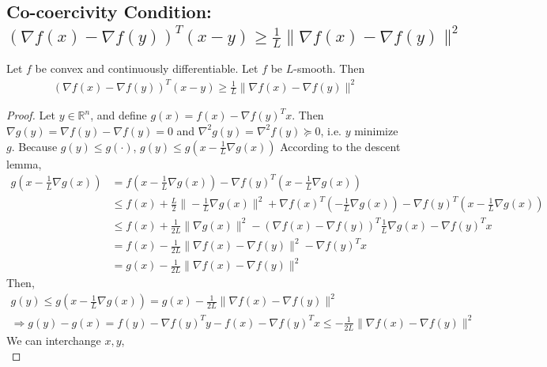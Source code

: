 \documentclass[11pt]{elegantbook}
\begin{document}
\subsection{Co-coercivity Condition: $(\nabla f(x)-\nabla f(y))^T(x-y)\geq \frac{1}{L}\|\nabla f(x)-\nabla f(y)\|^2$}
\begin{theorem}
Let $f$ be convex and continuously differentiable. Let $f$ be $L$-smooth. Then
\begin{equation}
    \begin{aligned}
        (\nabla f(x)-\nabla f(y))^T(x-y)\geq \frac{1}{L}\|\nabla f(x)-\nabla f(y)\|^2
    \end{aligned}
    \nonumber
\end{equation}
\end{theorem}
\begin{proof}
Let $y\in \mathbb{R}^n$, and define $g(x)=f(x)-\nabla f(y)^Tx$. Then $\nabla g(y)=\nabla f(y)-\nabla f(y)=0$ and $\nabla^2 g(y)=\nabla^2 f(y)\succeq 0$, i.e. $y$ minimize $g$. Because $g(y)\leq g(\cdot)$, $g(y)\leq g(x-\frac{1}{L}\nabla g(x))$
According to the descent lemma,
\begin{equation}
    \begin{aligned}
        g(x-\frac{1}{L}\nabla g(x))&=f(x-\frac{1}{L}\nabla g(x))-\nabla f(y)^T(x-\frac{1}{L}\nabla g(x))\\
        &\leq f(x)+\frac{L}{2}\|-\frac{1}{L}\nabla g(x)\|^2+\nabla f(x)^T(-\frac{1}{L}\nabla g(x))-\nabla f(y)^T(x-\frac{1}{L}\nabla g(x))\\
        &\leq f(x)+\frac{1}{2L}\|\nabla g(x)\|^2-(\nabla f(x)-\nabla f(y))^T\frac{1}{L}\nabla g(x)-\nabla f(y)^Tx\\
        &=f(x)-\frac{1}{2L}\|\nabla f(x)-\nabla f(y)\|^2-\nabla f(y)^Tx\\
        &=g(x)-\frac{1}{2L}\|\nabla f(x)-\nabla f(y)\|^2
    \end{aligned}
    \nonumber
\end{equation}
Then,
\begin{equation}
    \begin{aligned}
        g(y)\leq g(x-\frac{1}{L}\nabla g(x))=g(x)-\frac{1}{2L}\|\nabla f(x)-\nabla f(y)\|^2\\
        \Rightarrow	g(y)-g(x)=f(y)-\nabla f(y)^Ty-f(x)-\nabla f(y)^Tx\leq -\frac{1}{2L}\|\nabla f(x)-\nabla f(y)\|^2
    \end{aligned}
    \nonumber
\end{equation}
We can interchange $x,y$,
\begin{equation}

\end{equation}
\end{proof}
\end{document}
